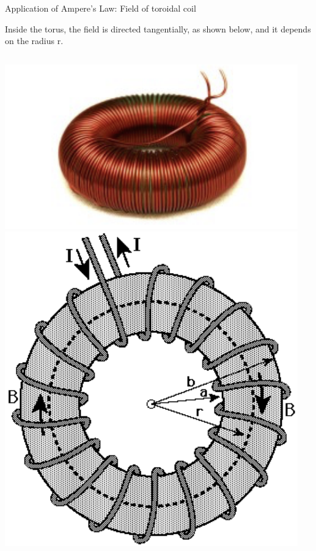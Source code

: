 \begin{frame}{Application of Ampere's Law: Field of toroidal coil}

Inside the torus, the field is directed tangentially, as shown below, and it depends on the radius r.\\

\begin{columns}
  \begin{column}{0.33\textwidth}
    \begin{center}
     \includegraphics[width=0.95\textwidth]{./images/photos/toroidal_coil.png}\\
     \includegraphics[width=0.95\textwidth]{./images/schematics/toroidal_coil_magnetic_field.png}\\

\end{center}
\end{column}
\end{columns}
\end{frame}
